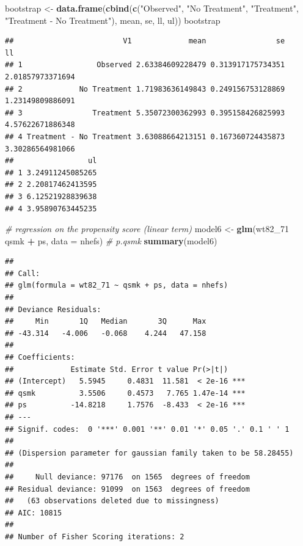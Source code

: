 \documentclass[
  10pt,
]{book}
\newenvironment{Shaded}{\begin{snugshade}}{\end{snugshade}}
\newcommand{\CommentTok}[1]{\textcolor[rgb]{0.56,0.35,0.01}{\textit{#1}}}
\newcommand{\DataTypeTok}[1]{\textcolor[rgb]{0.13,0.29,0.53}{#1}}
\newcommand{\DecValTok}[1]{\textcolor[rgb]{0.00,0.00,0.81}{#1}}
\newcommand{\KeywordTok}[1]{\textcolor[rgb]{0.13,0.29,0.53}{\textbf{#1}}}
\newcommand{\NormalTok}[1]{#1}
\newcommand{\OperatorTok}[1]{\textcolor[rgb]{0.81,0.36,0.00}{\textbf{#1}}}
\newcommand{\StringTok}[1]{\textcolor[rgb]{0.31,0.60,0.02}{#1}}
\begin{document}
\begin{Shaded}
\begin{Highlighting}[]
\NormalTok{bootstrap <-}\StringTok{ }\KeywordTok{data.frame}\NormalTok{(}\KeywordTok{cbind}\NormalTok{(}\KeywordTok{c}\NormalTok{(}\StringTok{"Observed"}\NormalTok{, }\StringTok{"No Treatment"}\NormalTok{, }\StringTok{"Treatment"}\NormalTok{, }
                                \StringTok{"Treatment - No Treatment"}\NormalTok{), mean, se, ll, ul))}
\NormalTok{bootstrap}
\end{Highlighting}
\end{Shaded}

\begin{verbatim}
##                         V1             mean                se               ll
## 1                 Observed 2.63384609228479 0.313917175734351 2.01857973371694
## 2             No Treatment 1.71983636149843 0.249156753128869 1.23149809886091
## 3                Treatment 5.35072300362993 0.395158426825993 4.57622671886348
## 4 Treatment - No Treatment 3.63088664213151 0.167360724435873 3.30286564981066
##                 ul
## 1 3.24911245085265
## 2 2.20817462413595
## 3 6.12521928839638
## 4 3.95890763445235
\end{verbatim}

\begin{Shaded}
\begin{Highlighting}[]
\CommentTok{# regression on the propensity score (linear term)}
\NormalTok{model6 <-}\StringTok{ }\KeywordTok{glm}\NormalTok{(wt82_}\DecValTok{71} \OperatorTok{~}\StringTok{ }\NormalTok{qsmk }\OperatorTok{+}\StringTok{ }\NormalTok{ps, }\DataTypeTok{data =}\NormalTok{ nhefs) }\CommentTok{# p.qsmk}
\KeywordTok{summary}\NormalTok{(model6)}
\end{Highlighting}
\end{Shaded}

\begin{verbatim}
## 
## Call:
## glm(formula = wt82_71 ~ qsmk + ps, data = nhefs)
## 
## Deviance Residuals: 
##     Min       1Q   Median       3Q      Max  
## -43.314   -4.006   -0.068    4.244   47.158  
## 
## Coefficients:
##             Estimate Std. Error t value Pr(>|t|)    
## (Intercept)   5.5945     0.4831  11.581  < 2e-16 ***
## qsmk          3.5506     0.4573   7.765 1.47e-14 ***
## ps          -14.8218     1.7576  -8.433  < 2e-16 ***
## ---
## Signif. codes:  0 '***' 0.001 '**' 0.01 '*' 0.05 '.' 0.1 ' ' 1
## 
## (Dispersion parameter for gaussian family taken to be 58.28455)
## 
##     Null deviance: 97176  on 1565  degrees of freedom
## Residual deviance: 91099  on 1563  degrees of freedom
##   (63 observations deleted due to missingness)
## AIC: 10815
## 
## Number of Fisher Scoring iterations: 2
\end{verbatim}
\end{document}
